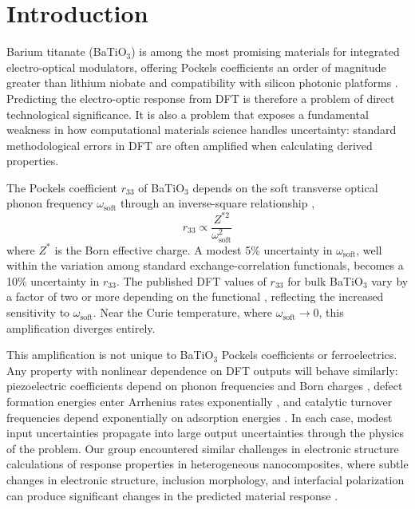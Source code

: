 \documentclass[prb,twocolumn,superscriptaddress,amsmath,amssymb,longbibliography]{revtex4-2}
\begin{document}
\maketitle

\section{Introduction}
\label{sec:intro}

Barium titanate (BaTiO$_3$) is among the most promising materials for 
integrated electro-optical modulators, offering Pockels coefficients an order of 
magnitude greater than lithium niobate and compatibility with silicon photonic 
platforms \cite{Abel2019,Eltes2020,Lines2001}. Predicting the 
electro-optic response from DFT is therefore a problem of direct 
technological significance. It is also a problem that exposes a fundamental 
weakness in how computational materials science handles uncertainty: standard methodological errors in DFT are often amplified when calculating derived properties.

The Pockels coefficient $r_{33}$ of BaTiO$_3$ depends on the soft transverse 
optical phonon frequency $\omega_{\mathrm{soft}}$ through an inverse-square 
relationship \cite{Veithen2005}, 
\begin{equation}
    r_{33} \propto \frac{Z^{*2}}{\omega_{\mathrm{soft}}^2}
    \label{eq:soft_mode}
\end{equation}
 where $Z^*$ is the Born effective charge. A modest 5\% 
 uncertainty in $\omega_{\mathrm{soft}}$, well within the variation among standard 
exchange-correlation functionals, becomes a 10\% uncertainty in $r_{33}$. 
The published DFT values of $r_{33}$ for bulk  BaTiO$_3$ vary by a factor of two or more 
depending on the functional \cite{Veithen2005,Wahl2008,Bilc2008}, 
reflecting the increased sensitivity to $\omega_{\mathrm{soft}}$. Near the 
Curie temperature, where $\omega_{\mathrm{soft}} \to 0$, this amplification 
diverges entirely.

This amplification is not unique to BaTiO$_3$ Pockels coefficients or ferroelectrics. Any property 
with nonlinear dependence on DFT outputs will behave similarly: piezoelectric coefficients depend on phonon frequencies and Born 
charges \cite{Wu2005_piezo}, defect formation energies enter 
Arrhenius rates exponentially \cite{Freysoldt2014}, and catalytic 
turnover frequencies depend exponentially on adsorption energies 
\cite{Norskov2004,Medford2015}. In each case, modest input uncertainties 
propagate into large output uncertainties through the physics of the problem. Our group encountered similar challenges in electronic structure calculations of response properties in heterogeneous nanocomposites, where subtle changes in electronic structure, inclusion morphology, and interfacial polarization can produce significant changes in the predicted material response \cite{Rowan2011,Henderson2023}.
\end{document}
